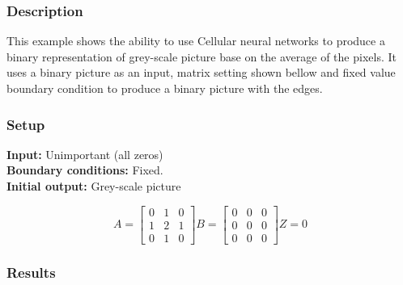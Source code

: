\subsubsection{Description}
This example shows the ability to use Cellular neural networks to produce a binary representation of grey-scale picture base on the average of the pixels. It uses a binary picture as an input, matrix setting shown bellow and fixed value boundary condition to produce a binary picture with the edges.
\subsubsection{Setup}

\textbf{Input:} Unimportant (all zeros)\\
\textbf{Boundary conditions:} Fixed.\\
\textbf{Initial output:} Grey-scale picture

\begin{minipage}{0.9\linewidth}
\begin{equation}
A =
\begin{bmatrix}
 0 & 1 & 0 \\
 1 & 2 & 1 \\
 0 & 1 & 0
\end{bmatrix}
B =
\begin{bmatrix}
 0 & 0 & 0 \\
 0 & 0 & 0 \\
 0 & 0 & 0
\end{bmatrix}
Z = 0
\end{equation}
\end{minipage}

\subsubsection{Results}



